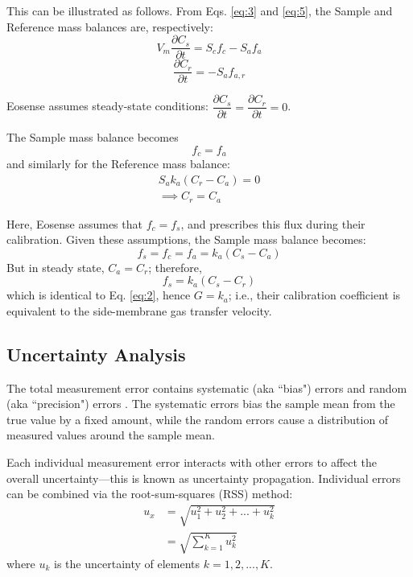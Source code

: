 \documentclass[11pt]{article}
\begin{document}
This can be illustrated as follows. From  Eqs. \ref{eq:3} and \ref{eq:5}, the Sample and Reference mass balances are, respectively:
\begin{equation*}
	V_m \frac{\partial C_s}{\partial t} = S_c f_c - S_a f_a
\end{equation*}
\begin{equation*}
	\frac{\partial C_r}{\partial t} = -S_a f_{a,r}
\end{equation*}

Eosense assumes steady-state conditions: $\dfrac{\partial C_s}{\partial t} = \dfrac{\partial C_r}{\partial t} = 0$.

The Sample mass balance becomes
\begin{equation*}
	f_c = f_a
\end{equation*}
and similarly for the Reference mass balance:
\begin{gather*}
	S_a k_a(C_r - C_a) = 0 \\
	\implies C_r = C_a
\end{gather*}

Here, Eosense assumes that $f_c = f_s$, and prescribes this flux during their calibration. Given these assumptions, the Sample mass balance becomes:
\begin{equation*}
	f_s = f_c = f_a = k_a(C_s - C_a)
\end{equation*}
But in steady state, $C_a = C_r$; therefore,
\begin{equation*}
	f_s = k_a(C_s - C_r)
\end{equation*}
which is identical to Eq. \ref{eq:2}, hence $G = k_a$; i.e., their calibration coefficient is equivalent to the side-membrane gas transfer velocity.

\subsection{Uncertainty Analysis}
The total measurement error contains systematic (aka ``bias") errors and random (aka ``precision") errors \parencite{figliola2019}. The systematic errors bias the sample mean from the true value by a fixed amount, while the random errors cause a distribution of measured values around the sample mean. 

Each individual measurement error interacts with other errors to affect the overall uncertainty---this is known as uncertainty propagation. Individual errors can be combined via the root-sum-squares (RSS) method:
\begin{equation} \label{eq:28}
	\begin{aligned}
	u_x &= \sqrt{u_1^2 + u_2^2 + ... + u_k^2} \\
		&= \sqrt{\sum_{k=1}^K u_k^2}
\end{aligned}
\end{equation}
where $u_k$ is the uncertainty of elements $k = 1, 2,..., K$.
\end{document}
